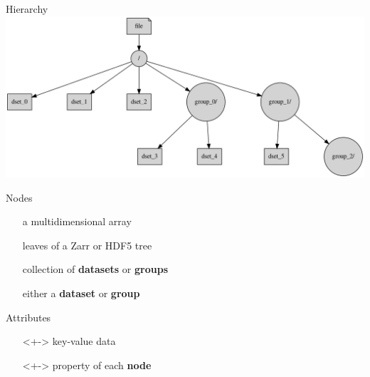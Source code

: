 \documentclass{beamer}
\begin{document}
\begin{frame}{Hierarchy}
  \includegraphics[width=1.0\textwidth]{images/tree.png}
\end{frame}

\begin{frame}{Nodes}
  \begin{definition}[Dataset]
    \begin{itemize}
    \item[] a multidimensional array
    \item[] leaves of a Zarr or HDF5 tree
    \end{itemize}
  \end{definition}
  \pause

  \begin{definition}[Group]
    \begin{itemize}
    \item[] collection of \textbf{datasets} or \textbf{groups}
    \end{itemize}
  \end{definition}
  \pause

  \begin{definition}[Node]
    \begin{itemize}
    \item[] either a \textbf{dataset} or \textbf{group}
    \end{itemize}
  \end{definition}
\end{frame}

\begin{frame}{Attributes}
  \begin{definition}[Attributes]
    \begin{itemize}
    \item[]<+-> key-value data
    \item[]<+-> property of each \textbf{node}
    \end{itemize}
  \end{definition}
\end{frame}
\end{document}
